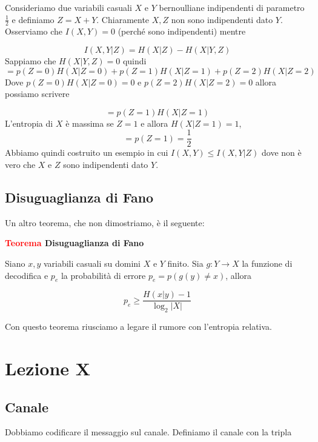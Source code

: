 \documentclass[12pt]{report}
\begin{document}
    \begin{exmp}
        Consideriamo due variabili casuali $X$ e $Y$ bernoulliane indipendenti di parametro $\frac{1}{2}$ e definiamo $Z = X+Y$. Chiaramente $X,Z$ non sono indipendenti dato $Y$. Osserviamo che  $I(X,Y) = 0$ (perché sono indipendenti) mentre

        $$I(X,Y|Z) = H(X|Z) - H(X|Y,Z)$$
        Sappiamo che $H(X|Y,Z) = 0$ quindi
        $$= p(Z = 0) H(X|Z = 0) + p(Z = 1) H(X|Z = 1) + p(Z = 2) H(X|Z = 2)$$
        Dove $p(Z = 0) H(X|Z = 0) = 0$ e $p(Z = 2) H(X|Z = 2) = 0$ allora possiamo scrivere

        $$= p(Z = 1) H(X|Z = 1)$$
        L'entropia di $X$ è massima se $Z = 1$ e allora $H(X|Z = 1) = 1$,
        $$= p(Z = 1) = \frac{1}{2}$$
        Abbiamo quindi costruito un esempio in cui $I(X,Y) \leq I(X,Y|Z)$ dove non è vero che $X$ e $Z$ sono indipendenti dato $Y$.
    \end{exmp}

    \section{Disuguaglianza di Fano}
    Un altro teorema, che non dimostriamo, è il seguente:
    \vspace{5px}
    \begin{tcolorbox}
        \textbf{\textcolor{red}{Teorema} Disuguaglianza di Fano}
        \vspace{5px}
        \begin{center}

            Siano $x,y$ variabili casuali su domini $X$ e $Y$ finito. Sia $g: Y \rightarrow X$ la funzione di decodifica e $p_e$ la probabilità di errore $p_e = p(g(y) \neq x)$, allora

            $$p_e \geq \frac{H(x|y) - 1}{\log_2{|X|}}$$
        \end{center}
    \end{tcolorbox}

    \noindent
    Con questo teorema riusciamo a legare il rumore con l'entropia relativa.


    \chapter{Lezione X}


    \section{Canale}
    Dobbiamo codificare il messaggio sul canale. Definiamo il canale con la tripla
\end{document}
